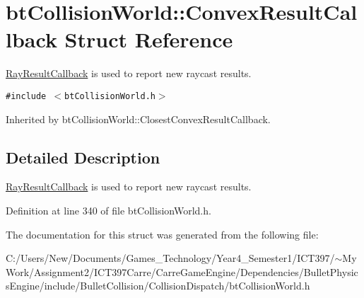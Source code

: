 \hypertarget{structbt_collision_world_1_1_convex_result_callback}{
\section{btCollisionWorld::ConvexResultCallback Struct Reference}
\label{structbt_collision_world_1_1_convex_result_callback}
}
\hyperlink{structbt_collision_world_1_1_ray_result_callback}{RayResultCallback} is used to report new raycast results.  


{\tt \#include $<$btCollisionWorld.h$>$}

Inherited by btCollisionWorld::ClosestConvexResultCallback.



\subsection{Detailed Description}
\hyperlink{structbt_collision_world_1_1_ray_result_callback}{RayResultCallback} is used to report new raycast results. 

Definition at line 340 of file btCollisionWorld.h.

The documentation for this struct was generated from the following file:\begin{CompactItemize}
\item 
C:/Users/New/Documents/Games\_\-Technology/Year4\_\-Semester1/ICT397/$\sim$My Work/Assignment2/ICT397Carre/CarreGameEngine/Dependencies/BulletPhysicsEngine/include/BulletCollision/CollisionDispatch/btCollisionWorld.h\end{CompactItemize}
